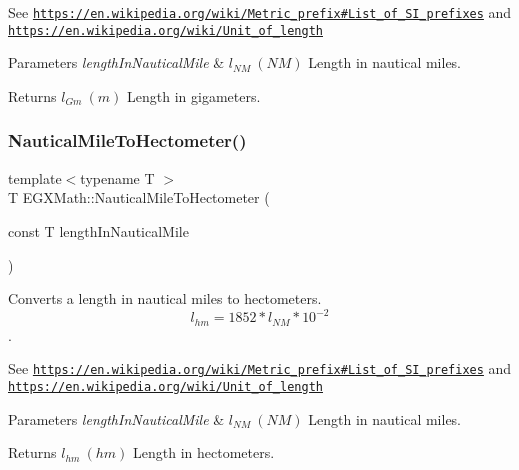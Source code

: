 See \href{https://en.wikipedia.org/wiki/Metric_prefix#List_of_SI_prefixes}{\tt https\+://en.\+wikipedia.\+org/wiki/\+Metric\+\_\+prefix\#\+List\+\_\+of\+\_\+\+S\+I\+\_\+prefixes} and \href{https://en.wikipedia.org/wiki/Unit_of_length}{\tt https\+://en.\+wikipedia.\+org/wiki/\+Unit\+\_\+of\+\_\+length} 
\begin{DoxyParams}{Parameters}
{\em length\+In\+Nautical\+Mile} & $ l_{NM}\ (NM)$ Length in nautical miles. \\
\hline
\end{DoxyParams}
\begin{DoxyReturn}{Returns}
$ l_{Gm}\ (m)$ Length in gigameters. 
\end{DoxyReturn}
\mbox{\label{group___e_g_x_math-_conversions-_length_conversions-_nautical-_nautical_mile-_s_i_gab23b612d39bfe199f77deb6d8d3d044d}} 
\subsubsection{\texorpdfstring{Nautical\+Mile\+To\+Hectometer()}{NauticalMileToHectometer()}}
{\footnotesize\ttfamily template$<$typename T $>$ \\
T E\+G\+X\+Math\+::\+Nautical\+Mile\+To\+Hectometer (\begin{DoxyParamCaption}\item[{const T}]{length\+In\+Nautical\+Mile }\end{DoxyParamCaption})}



Converts a length in nautical miles to hectometers. \[ l_{hm}=1852 * l_{NM} * 10^{-2} \]. 

See \href{https://en.wikipedia.org/wiki/Metric_prefix#List_of_SI_prefixes}{\tt https\+://en.\+wikipedia.\+org/wiki/\+Metric\+\_\+prefix\#\+List\+\_\+of\+\_\+\+S\+I\+\_\+prefixes} and \href{https://en.wikipedia.org/wiki/Unit_of_length}{\tt https\+://en.\+wikipedia.\+org/wiki/\+Unit\+\_\+of\+\_\+length} 
\begin{DoxyParams}{Parameters}
{\em length\+In\+Nautical\+Mile} & $ l_{NM}\ (NM)$ Length in nautical miles. \\
\hline
\end{DoxyParams}
\begin{DoxyReturn}{Returns}
$ l_{hm}\ (hm)$ Length in hectometers. 
\end{DoxyReturn}
\mbox{\label{group___e_g_x_math-_conversions-_length_conversions-_nautical-_nautical_mile-_s_i_ga3bdd35fac83cfac8d0f6cfc789d1c8f4}} 
